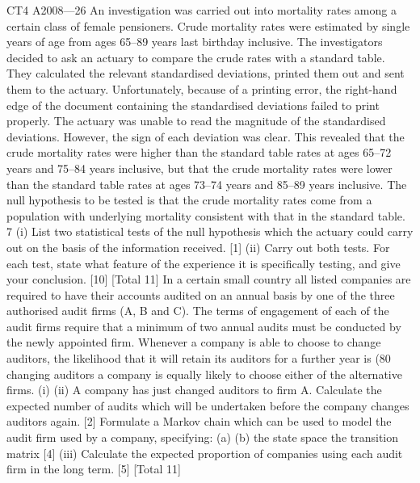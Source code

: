 \documentclass[a4paper,12pt]{article}
\begin{document}
\begin{enumerate}
CT4 A2008—26
An investigation was carried out into mortality rates among a certain class of female
pensioners. Crude mortality rates were estimated by single years of age from ages
65–89 years last birthday inclusive. The investigators decided to ask an actuary to
compare the crude rates with a standard table. They calculated the relevant
standardised deviations, printed them out and sent them to the actuary.
Unfortunately, because of a printing error, the right-hand edge of the document
containing the standardised deviations failed to print properly. The actuary was
unable to read the magnitude of the standardised deviations. However, the sign of
each deviation was clear. This revealed that the crude mortality rates were higher
than the standard table rates at ages 65–72 years and 75–84 years inclusive, but that
the crude mortality rates were lower than the standard table rates at ages 73–74 years
and 85–89 years inclusive.
The null hypothesis to be tested is that the crude mortality rates come from a
population with underlying mortality consistent with that in the standard table.
7
(i) List two statistical tests of the null hypothesis which the actuary could carry
out on the basis of the information received.
[1]
(ii) Carry out both tests. For each test, state what feature of the experience it is
specifically testing, and give your conclusion.
[10]
[Total 11]
In a certain small country all listed companies are required to have their accounts
audited on an annual basis by one of the three authorised audit firms (A, B and C).
The terms of engagement of each of the audit firms require that a minimum of two
annual audits must be conducted by the newly appointed firm. Whenever a company
is able to choose to change auditors, the likelihood that it will retain its auditors for a
further year is (80%
changing auditors a company is equally likely to choose either of the alternative firms.
(i)
(ii)
A company has just changed auditors to firm A. Calculate the expected
number of audits which will be undertaken before the company changes
auditors again.
[2]
Formulate a Markov chain which can be used to model the audit firm used by
a company, specifying:
(a)
(b)
the state space
the transition matrix
[4]
(iii)
Calculate the expected proportion of companies using each audit firm in the
long term.
[5]
[Total 11]


\end{enumerate}
\end{document}
